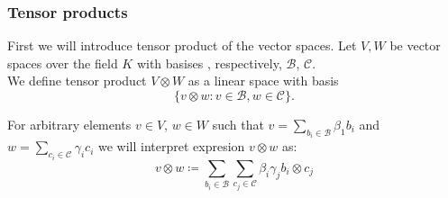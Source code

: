 \documentclass[a4paper, 12pt]{article}
\begin{document}
\subsubsection{Tensor products}
%
First we will introduce tensor product of the vector spaces. Let $V, W$ be vector spaces over the field $K$
with basises , respectively, $\mathcal{B}$, $\mathcal{C}$. \\
We define tensor product $V \otimes W$ as a linear space with basis
\begin{equation*}
\{v \otimes w : v \in \mathcal{B}, w \in \mathcal{C} \}.
\end{equation*}

For arbitrary elements $v \in V$, $w \in W$ such that $v =\sum_{b_i\in \mathcal{B}}
\beta_1 b_i$ and $w = \sum_{c_i \in \mathcal{C}} \gamma_i c_i$ we will interpret
expresion $v \otimes w$ as:
\begin{equation*}
        v \otimes w \coloneqq \sum_{b_i \in \mathcal{B}}\sum_{c_j \in \mathcal{C}} \beta_i\gamma_j
        b_i\otimes c_j
\end{equation*}
\end{document}
